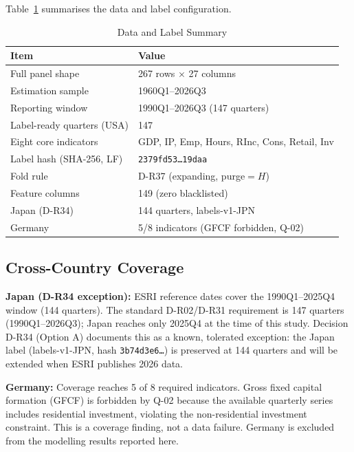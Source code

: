 \documentclass[conference]{IEEEtran}
\begin{document}
Table~\ref{tab:data} summarises the data and label configuration.

\begin{table}[htbp]
\caption{Data and Label Summary}
\label{tab:data}
\centering
\begin{tabular}{ll}
\toprule
\textbf{Item} & \textbf{Value} \\
\midrule
Full panel shape & 267 rows $\times$ 27 columns \\
Estimation sample & 1960Q1--2026Q3 \\
Reporting window & 1990Q1--2026Q3 (147 quarters) \\
Label-ready quarters (USA) & 147 \\
Eight core indicators & GDP, IP, Emp, Hours, RInc, Cons, Retail, Inv \\
Label hash (SHA-256, LF) & \texttt{2379fd53\ldots19daa} \\
Fold rule & D-R37 (expanding, purge$=H$) \\
Feature columns & 149 (zero blacklisted) \\
Japan (D-R34) & 144 quarters, labels-v1-JPN \\
Germany & 5/8 indicators (GFCF forbidden, Q-02) \\
\bottomrule
\end{tabular}
\end{table}

\subsection{Cross-Country Coverage}

\textbf{Japan (D-R34 exception):} ESRI reference dates \cite{ESRI_dates} cover the
1990Q1--2025Q4 window (144 quarters). The standard D-R02/D-R31 requirement is 147
quarters (1990Q1--2026Q3); Japan reaches only 2025Q4 at the time of this study.
Decision D-R34 (Option A) documents this as a known, tolerated exception:
the Japan label (labels-v1-JPN, hash \texttt{3b74d3e6\ldots}) is preserved at 144
quarters and will be extended when ESRI publishes 2026 data.

\textbf{Germany:} Coverage reaches 5 of 8 required indicators. Gross fixed capital
formation (GFCF) is forbidden by Q-02 because the available quarterly series
includes residential investment, violating the non-residential investment constraint.
This is a coverage finding, not a data failure. Germany is excluded from
the modelling results reported here.

\end{document}
